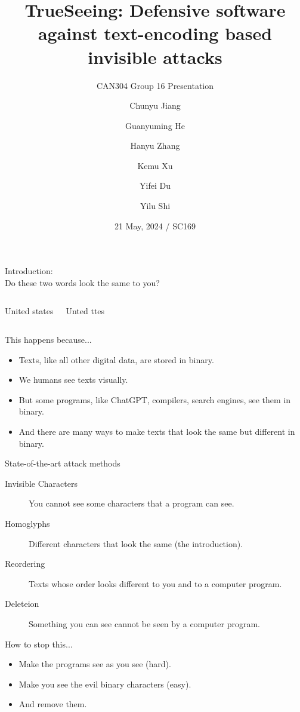 \documentclass{beamer}
\title[CAN304 Group 16 Presentation]
{TrueSeeing: Defensive software against text-encoding based invisible attacks}
\author[Group 16]
{%
	Chunyu Jiang \and
	Guanyuming He \and
	Hanyu Zhang \and
	Kemu Xu \and
	Yifei Du \and
	Yilu Shi%
}
\subtitle
{CAN304 Group 16 Presentation}
\institute[XJTLU]
{
	Department of Computing, School of Advanced Technology\\
	Xi'an Jiaotong-Liverpool University%
}
\date
{21 May, 2024 / SC169}
\begin{document}
	
\begin{frame}
	\titlepage
\end{frame}


\begin{frame}{Introduction:\\Do these two words look the same to you?}
\begin{columns}
	\Large
	{\unicodefont United states}
	
	{\unicodefont Unted ttes}
\end{columns}
\end{frame}

\begin{frame}{This happens because...}
\begin{itemize}
	\item Texts, like all other digital data, are stored in binary.
	\item We humans see texts visually.
	\item But some programs, like ChatGPT, compilers, search engines, see them in binary.
	\item And there are many ways to make texts that look the same but different in binary.
\end{itemize}
\end{frame}

\begin{frame}{State-of-the-art attack methods}
\begin{description}
	\item[Invisible Characters] You cannot see some characters that a program can see.
	\item[Homoglyphs] Different characters that look the same (the introduction).
	\item[Reordering] Texts whose order looks different to you and to a computer program.
	\item[Deleteion] Something you can see cannot be seen by a computer program.
\end{description}
\end{frame}

\begin{frame}{How to stop this...}
	\begin{itemize}
		\item Make the programs see as you see (hard).
		\item Make you see the evil binary characters (easy).
		\item And remove them.
	\end{itemize}
\end{frame}
\end{document}
